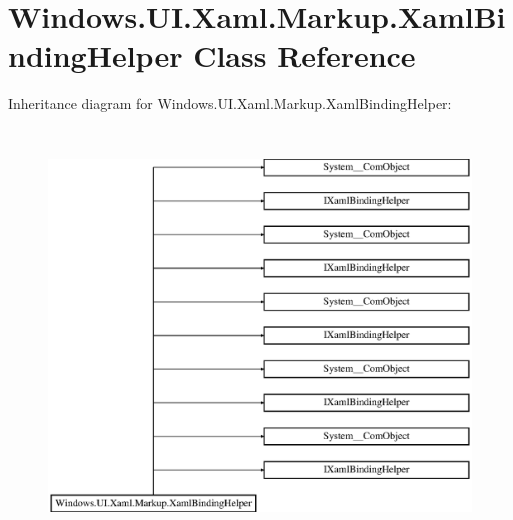 \hypertarget{class_windows_1_1_u_i_1_1_xaml_1_1_markup_1_1_xaml_binding_helper}{}\section{Windows.\+U\+I.\+Xaml.\+Markup.\+Xaml\+Binding\+Helper Class Reference}
\label{class_windows_1_1_u_i_1_1_xaml_1_1_markup_1_1_xaml_binding_helper}
Inheritance diagram for Windows.\+U\+I.\+Xaml.\+Markup.\+Xaml\+Binding\+Helper\+:\begin{figure}[H]
\begin{center}
\leavevmode
\includegraphics[height=11.000000cm]{class_windows_1_1_u_i_1_1_xaml_1_1_markup_1_1_xaml_binding_helper}
\end{center}
\end{figure}
